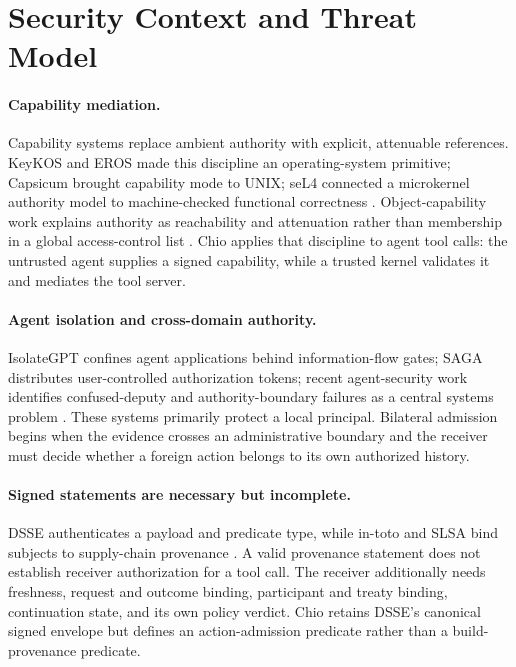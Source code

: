 \section{Security Context and Threat Model}

\paragraph{Capability mediation.}
Capability systems replace ambient authority with explicit, attenuable references. KeyKOS and EROS made this discipline an operating-system primitive; Capsicum brought capability mode to UNIX; seL4 connected a microkernel authority model to machine-checked functional correctness \cite{hardy1985keykos,shapiro1999eros,watson2010capsicum,klein2009sel4}. Object-capability work explains authority as reachability and attenuation rather than membership in a global access-control list \cite{miller2006composition,murray2010ocap}. Chio applies that discipline to agent tool calls: the untrusted agent supplies a signed capability, while a trusted kernel validates it and mediates the tool server.

\paragraph{Agent isolation and cross-domain authority.}
IsolateGPT confines agent applications behind information-flow gates; SAGA distributes user-controlled authorization tokens; recent agent-security work identifies confused-deputy and authority-boundary failures as a central systems problem \cite{isolategptNDSS2025,sagaNDSS2025,agenticFoundations2025}. These systems primarily protect a local principal. Bilateral admission begins when the evidence crosses an administrative boundary and the receiver must decide whether a foreign action belongs to its own authorized history.

\paragraph{Signed statements are necessary but incomplete.}
DSSE authenticates a payload and predicate type, while in-toto and SLSA bind subjects to supply-chain provenance \cite{dsse,torres2019intoto,slsa}. A valid provenance statement does not establish receiver authorization for a tool call. The receiver additionally needs freshness, request and outcome binding, participant and treaty binding, continuation state, and its own policy verdict. Chio retains DSSE's canonical signed envelope but defines an action-admission predicate rather than a build-provenance predicate.


